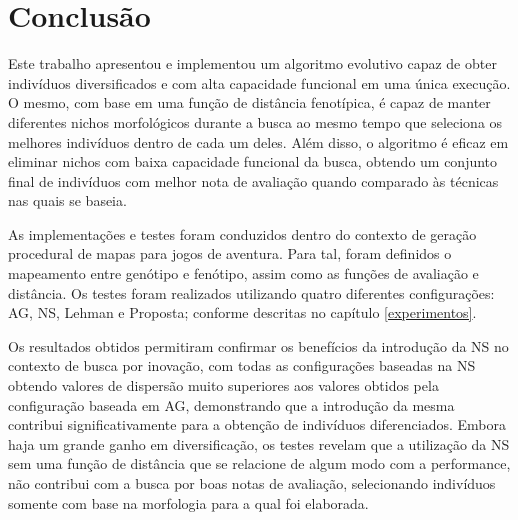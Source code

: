 \chapter{Conclusão}
\label{conclusao}


Este trabalho apresentou e implementou um algoritmo evolutivo capaz de obter indivíduos diversificados e com alta capacidade funcional em uma única execução. O mesmo,  com base em uma função de distância fenotípica, é capaz de manter diferentes nichos morfológicos durante a busca ao mesmo tempo que seleciona os melhores indivíduos dentro de cada um deles. Além disso, o algoritmo é eficaz em eliminar nichos com baixa capacidade funcional da busca, obtendo um conjunto final de indivíduos com melhor nota de avaliação quando comparado às técnicas nas quais se baseia.

As implementações e testes foram conduzidos dentro do contexto de geração procedural de mapas para jogos de aventura. Para tal, foram definidos o mapeamento entre genótipo e fenótipo, assim como as funções de avaliação e distância. Os testes foram realizados utilizando quatro diferentes configurações: AG, NS, Lehman e Proposta; conforme descritas no capítulo \ref{experimentos}.

Os resultados obtidos permitiram confirmar os benefícios da introdução da NS no contexto de busca por inovação, com todas as configurações baseadas na NS obtendo valores de dispersão muito superiores aos valores obtidos pela configuração baseada em AG, demonstrando que a introdução da mesma contribui significativamente para a obtenção de indivíduos diferenciados. Embora haja um grande ganho em diversificação, os testes revelam que a utilização da NS sem uma função de distância que se relacione de algum modo com a performance, não contribui com a busca por boas notas de avaliação, selecionando indivíduos somente com base na morfologia para a qual foi elaborada.

